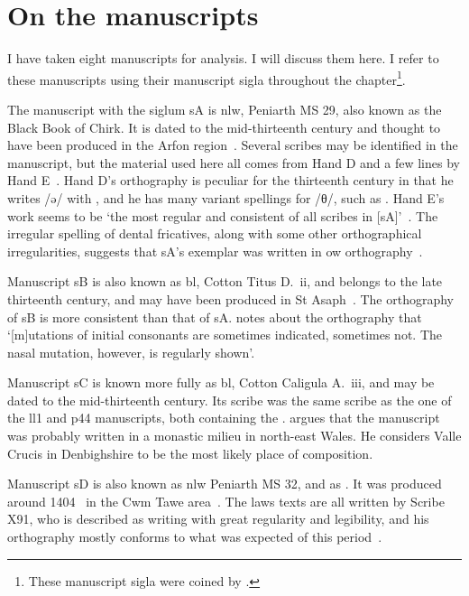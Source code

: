 \section{On the manuscripts}
\label{sec:manuscripts}
I have taken eight manuscripts for analysis. I will discuss them here. I refer to these manuscripts using their manuscript sigla throughout the chapter\footnote{These manuscript sigla were coined by \textcite{owen_ancient_1841}.}.

The manuscript with the siglum \gls{sA} is  \gls{nlw}, Peniarth MS 29, also known as the Black Book of Chirk.
It is dated to the mid-thirteenth century and thought to have been produced in the Arfon region~\autocite[171]{Rus_Scribal95}.
Several scribes may be identified in the manuscript, but the material used here all comes from Hand D and a few lines by Hand E~\autocite[133--134]{Rus_Scribal95}.
Hand D's orthography is peculiar for the thirteenth century in that he writes /ə/ with , and he has many variant spellings for /θ/, such as .
Hand E's work seems to be `the most regular and consistent of all scribes in [\gls{sA}]'~\autocite[152]{Rus_Scribal95}.
The irregular spelling of dental fricatives, along with some other orthographical irregularities, suggests that \gls{sA}'s exemplar was written in \gls{ow} orthography~\autocite[169]{Rus_Scribal95}. 

Manuscript \gls{sB} is also known as \gls{bl}, Cotton Titus D.~ii, and belongs to the late thirteenth century, and may have been produced in St Asaph~\autocite[v]{elias_golygiad_2007}. The orthography of \gls{sB} is more consistent than that of \gls{sA}. \Textcite[xlii]{wiliam_llyfr_1960} notes about the orthography that `[m]utations of initial consonants are sometimes indicated, sometimes not. The nasal mutation, however, is regularly shown'.

Manuscript \gls{sC} is known more fully as \gls{bl}, Cotton Caligula A.~iii, and may be dated to the mid-thirteenth century. Its scribe was the same scribe as the one of the \gls{ll1} and \gls{p44} manuscripts, both containing the . \Textcite[189]{huws_medieval_2000} argues that the manuscript was probably written in a monastic milieu in north-east Wales. He considers Valle Crucis in Denbighshire to be the most likely place of composition.

Manuscript \gls{sD} is also known as \gls{nlw} Peniarth MS 32, and as . It was produced around 1404~\autocite[60]{huws_medieval_2000} in the Cwm Tawe area~\autocite[v]{elias_golygiad_2007}. The laws texts are all written by Scribe X91, who is described as writing with great regularity and legibility, and his orthography mostly conforms to what was expected of this period~\autocite{thomas_tei_2013}.

